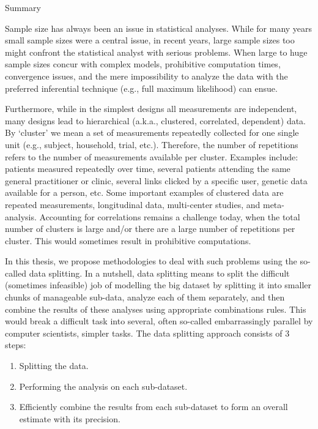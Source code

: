 \documentclass[14pt]{article}
\begin{document}
\begin{center}
{\Huge{Summary}}
\end{center}
\vspace{1cm}
Sample size has always been an issue in statistical analyses. While for many years small sample sizes were a central issue, in recent years, large sample sizes too might confront the statistical analyst with serious problems. When large to huge sample sizes concur with complex models, prohibitive computation times, convergence issues, and the mere impossibility to analyze the data with the preferred inferential technique (e.g., full maximum likelihood) can ensue. 

Furthermore, while in the simplest designs all measurements are independent, many designs lead to hierarchical (a.k.a., clustered, correlated, dependent) data. By `cluster' we mean a set of measurements repeatedly collected for one single unit (e.g., subject, household, trial, etc.). Therefore, the number of repetitions refers to the number of measurements available per cluster. Examples include: patients measured repeatedly over time, several patients attending the same general practitioner or clinic, several links clicked by a specific user, genetic data available for a person, etc. Some important examples of clustered data are repeated measurements, longitudinal data, multi-center studies, and meta-analysis. Accounting for correlations remains a challenge today, when the total number of clusters is large and/or there are a large number of repetitions per cluster. This would sometimes result in prohibitive computations. 

In this thesis, we propose methodologies to deal with such problems using the so-called data splitting. In a nutshell, data splitting means to split the difficult (sometimes infeasible) job of modelling the big dataset by splitting it into smaller chunks of manageable sub-data, analyze each of them separately, and then combine the results of these analyses using appropriate combinations rules. This would break a difficult task into several, often so-called embarrassingly parallel by computer scientists, simpler tasks. The data splitting approach consists of 3 steps:
\begin{enumerate}
\item Splitting the data.
\item Performing the analysis on each sub-dataset.
\item Efficiently combine the results from each sub-dataset to form an overall estimate with its precision.
\end{enumerate}
\end{document}
